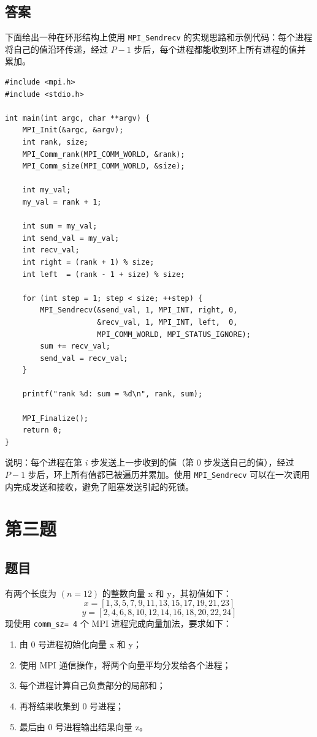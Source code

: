 \section{答案}
下面给出一种在环形结构上使用 \texttt{MPI\_Sendrecv} 的实现思路和示例代码：每个进程将自己的值沿环传递，经过 $P-1$ 步后，每个进程都能收到环上所有进程的值并累加。

\begin{lstlisting}[style=cleancpp]
#include <mpi.h>
#include <stdio.h>

int main(int argc, char **argv) {
    MPI_Init(&argc, &argv);
    int rank, size;
    MPI_Comm_rank(MPI_COMM_WORLD, &rank);
    MPI_Comm_size(MPI_COMM_WORLD, &size);

    int my_val; 
    my_val = rank + 1;

    int sum = my_val;
    int send_val = my_val;
    int recv_val;
    int right = (rank + 1) % size;
    int left  = (rank - 1 + size) % size;

    for (int step = 1; step < size; ++step) {
        MPI_Sendrecv(&send_val, 1, MPI_INT, right, 0,
                     &recv_val, 1, MPI_INT, left,  0,
                     MPI_COMM_WORLD, MPI_STATUS_IGNORE);
        sum += recv_val;
        send_val = recv_val;
    }

    printf("rank %d: sum = %d\n", rank, sum);

    MPI_Finalize();
    return 0;
}
\end{lstlisting}

说明：每个进程在第 $i$ 步发送上一步收到的值（第 0 步发送自己的值），经过 $P-1$ 步后，环上所有值都已被遍历并累加。使用 \texttt{MPI\_Sendrecv} 可以在一次调用内完成发送和接收，避免了阻塞发送引起的死锁。

\chapter{第三题}

\section{题目}

有两个长度为 $(n=12)$ 的整数向量 x 和 y，其初值如下：
$$ x=[1, 3, 5, 7, 9, 11, 13, 15, 17, 19, 21, 23] $$
$$ y=[2, 4, 6, 8, 10, 12, 14, 16, 18, 20, 22, 24] $$
现使用 \texttt{comm\_sz= 4} 个 MPI 进程完成向量加法，要求如下：
\begin{enumerate}
    \item 由 0 号进程初始化向量 x 和 y；
    \item 使用 MPI 通信操作，将两个向量平均分发给各个进程；
    \item 每个进程计算自己负责部分的局部和；
    \item 再将结果收集到 0 号进程；
    \item 最后由 0 号进程输出结果向量 z。
\end{enumerate}

